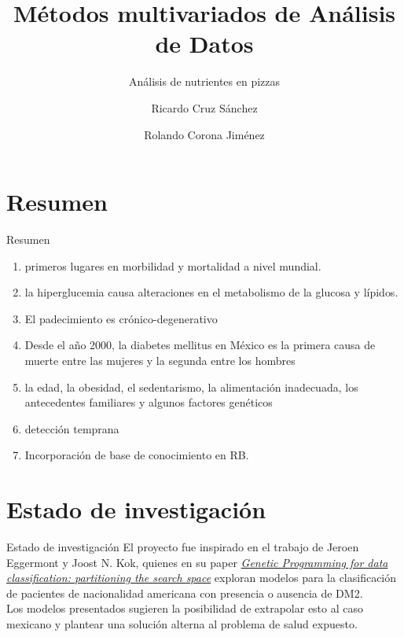 \documentclass[pdf]{beamer}
\title{Métodos multivariados de Análisis de Datos}
\subtitle{Análisis de nutrientes en pizzas}
\author{
Ricardo Cruz Sánchez \\
  \and
Rolando Corona Jiménez
}
\institute[CIMAT]{CIMAT}
\begin{document}
\begin{frame}
\titlepage
\end{frame}


\section{Resumen}

\begin{frame}{Resumen}
\begin{enumerate}
\item primeros lugares en morbilidad y mortalidad a nivel mundial.
\item la hiperglucemia causa alteraciones en el metabolismo de la glucosa y l\'ipidos.
\item El padecimiento es cr\'onico-degenerativo
\item Desde el a\~no 2000, la diabetes mellitus en M\'exico es la primera causa de muerte entre las mujeres y la segunda entre los hombres
\item la edad, la obesidad, el sedentarismo, la alimentación inadecuada, los antecedentes familiares y algunos factores gen\'eticos
\item detección temprana
\item Incorporación de base de conocimiento en RB.
\end{enumerate}
\end{frame}


\section{Estado de investigación}
\begin{frame}{Estado de investigación}
El proyecto fue inspirado en el trabajo de Jeroen Eggermont y Joost N. Kok, quienes en su paper \underline{\textit{Genetic Programming for data classification: partitioning the search space}} exploran modelos para la clasificaci\'on de pacientes de nacionalidad americana con presencia o ausencia de DM2.\\

Los modelos presentados sugieren la posibilidad de extrapolar esto al caso mexicano y plantear una soluci\'on alterna al problema de salud expuesto.\\
\end{frame}
\end{document}
